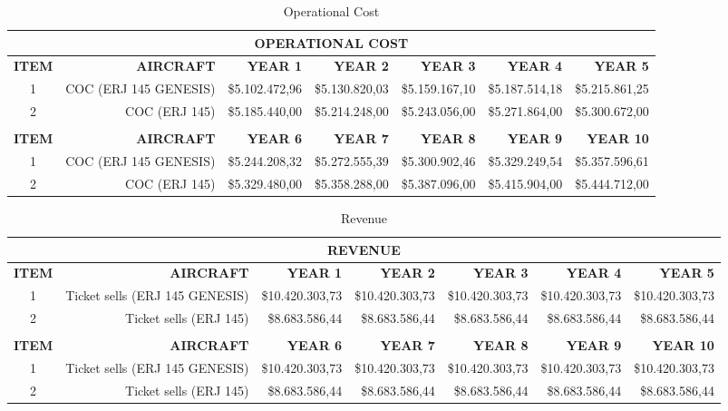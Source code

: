 \begin{table}[H]
  \scriptsize
  \centering
  \caption{Operational Cost}
    \begin{tabular}{rrrrrrr}
    \toprule
    \multicolumn{7}{c}{\textbf{OPERATIONAL COST}} \\
    \midrule
    \textbf{ITEM} & \textbf{AIRCRAFT} & \textbf{YEAR 1} & \textbf{YEAR 2} & \textbf{YEAR 3} & \textbf{YEAR 4} & \textbf{YEAR 5} \\
    \multicolumn{1}{c}{1} & COC (ERJ 145 GENESIS) & \$5.102.472,96 & \$5.130.820,03 & \$5.159.167,10 & \$5.187.514,18 & \$5.215.861,25 \\
    \multicolumn{1}{c}{2} & COC (ERJ 145) & \$5.185.440,00 & \$5.214.248,00 & \$5.243.056,00 & \$5.271.864,00 & \$5.300.672,00 \\
          &       &       &       &       &       &  \\
    \textbf{ITEM} & \textbf{AIRCRAFT} & \textbf{YEAR 6} & \textbf{YEAR 7} & \textbf{YEAR 8} & \textbf{YEAR 9} & \textbf{YEAR 10} \\
    \multicolumn{1}{c}{1} & COC (ERJ 145 GENESIS) & \$5.244.208,32 & \$5.272.555,39 & \$5.300.902,46 & \$5.329.249,54 & \$5.357.596,61 \\
    \multicolumn{1}{c}{2} & COC (ERJ 145) & \$5.329.480,00 & \$5.358.288,00 & \$5.387.096,00 & \$5.415.904,00 & \$5.444.712,00 \\
    \bottomrule
    \end{tabular}%
  \label{tab:financeCostOperation1}%
\end{table}%


\begin{table}[H]
  \scriptsize
  \centering
  \caption{Revenue}
    \begin{tabular}{crrrrrr}
    \toprule
    \multicolumn{7}{c}{\textbf{REVENUE}} \\
    \midrule
    \textbf{ITEM} & \textbf{AIRCRAFT} & \textbf{YEAR 1} & \textbf{YEAR 2} & \textbf{YEAR 3} & \textbf{YEAR 4} & \textbf{YEAR 5} \\
    1     & Ticket sells (ERJ 145 GENESIS) & \$10.420.303,73 & \$10.420.303,73 & \$10.420.303,73 & \$10.420.303,73 & \$10.420.303,73 \\
    2     & Ticket sells (ERJ 145) & \$8.683.586,44 & \$8.683.586,44 & \$8.683.586,44 & \$8.683.586,44 & \$8.683.586,44 \\
          &       &       &       &       &       &  \\
    \textbf{ITEM} & \textbf{AIRCRAFT} & \textbf{YEAR 6} & \textbf{YEAR 7} & \textbf{YEAR 8} & \textbf{YEAR 9} & \textbf{YEAR 10} \\
    1     & Ticket sells (ERJ 145 GENESIS) & \$10.420.303,73 & \$10.420.303,73 & \$10.420.303,73 & \$10.420.303,73 & \$10.420.303,73 \\
    2     & Ticket sells (ERJ 145) & \$8.683.586,44 & \$8.683.586,44 & \$8.683.586,44 & \$8.683.586,44 & \$8.683.586,44 \\
    \bottomrule
    \end{tabular}%
  \label{tab:financeRevenue}%
\end{table}%



